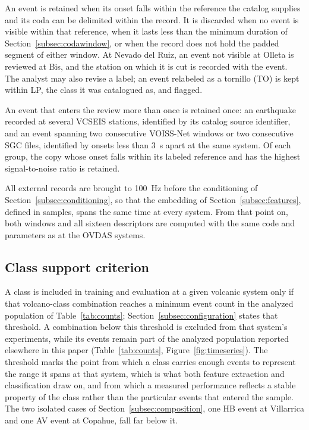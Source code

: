 \documentclass[pdflatex,sn-mathphys-num]{sn-jnl}
\begin{document}
An event is retained when its onset falls within the reference the catalog
supplies and its coda can be delimited within the record. It is discarded
when no event is visible within that reference, when it lasts less than the
minimum duration of Section~\ref{subsec:codawindow}, or when the record does
not hold the padded segment of either window. At Nevado del Ruiz, an event
not visible at Olleta is reviewed at Bis, and the station on which it is cut
is recorded with the event. The analyst may also revise a label; an event
relabeled as a tornillo (TO) is kept within LP, the class it was catalogued
as, and flagged.

An event that enters the review more than once is retained once: an
earthquake recorded at several VCSEIS stations, identified by its catalog
source identifier, and an event spanning two consecutive VOISS-Net windows or
two consecutive SGC files, identified by onsets less than 3~s apart at the
same system. Of each group, the copy whose onset falls within its labeled
reference and has the highest signal-to-noise ratio is retained.

All external records are brought to 100~Hz before the conditioning of
Section~\ref{subsec:conditioning}, so that the embedding of
Section~\ref{subsec:features}, defined in samples, spans the same time at
every system. From that point on, both windows and all sixteen descriptors
are computed with the same code and parameters as at the OVDAS systems.


\subsection{Class support criterion}\label{subsec:classsupport}

A class is included in training and evaluation at a given volcanic system
only if that volcano-class combination reaches a minimum event count in the
analyzed population of Table~\ref{tab:counts}; Section~\ref{subsec:configuration}
states that threshold. A combination below this
threshold is excluded from that system's experiments, while its events
remain part of the analyzed population reported elsewhere in this paper
(Table~\ref{tab:counts}, Figure~\ref{fig:timeseries}). The threshold marks
the point from which a class carries enough events to represent the range it
spans at that system, which is what both feature extraction and
classification draw on, and from which a measured performance reflects a
stable property of the class rather than the particular events that entered
the sample. The two isolated cases of Section~\ref{subsec:composition}, one
HB event at Villarrica and one AV event at Copahue, fall far below it.
\end{document}

